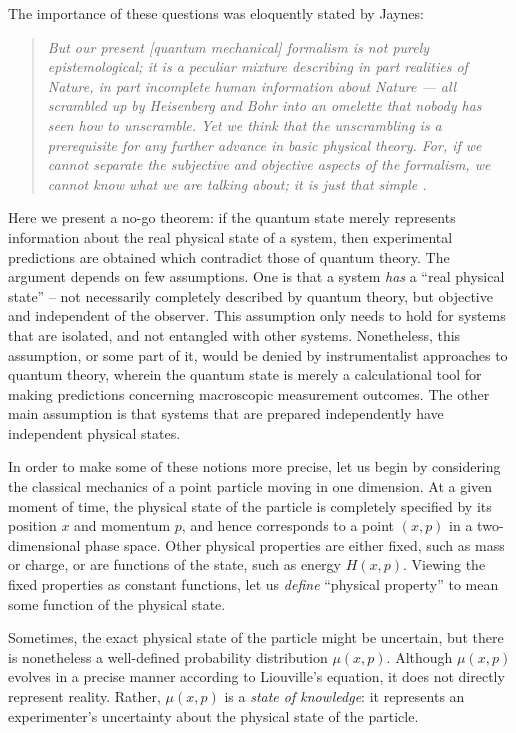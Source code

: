 \documentclass[amsmath,amssymb,superscriptaddress,pra,12pt]{revtex4-1}
\begin{document}
The importance of these questions was eloquently stated by Jaynes:
\begin{quotation}
\emph{But our present [quantum mechanical] formalism is not purely epistemological; it is a peculiar mixture describing in part realities of Nature, in part incomplete human information about Nature --- all scrambled up by Heisenberg and Bohr into an omelette that nobody has seen how to unscramble. Yet we think that the unscrambling is a prerequisite for any further advance in basic physical theory. For, if we cannot separate the subjective and objective aspects of the formalism, we cannot know what we are talking about; it is just that simple \cite{jaynesquote2}.}
\end{quotation}

Here we present a no-go theorem: if the quantum state merely represents information about the real physical state of a system, then experimental predictions are obtained which contradict those of quantum theory. The argument depends on few assumptions. One is that a system \emph{has} a ``real physical state'' -- not necessarily completely described by quantum theory, but objective and independent of the observer. This assumption only needs to hold for systems that are isolated, and not entangled with other systems. Nonetheless, this assumption, or some part of it, would be denied by instrumentalist approaches to quantum theory, wherein the quantum state is merely a calculational tool for making predictions concerning macroscopic measurement outcomes. The other main assumption is that systems that are prepared independently have independent physical states.

In order to make some of these notions more precise, let us begin by considering the classical mechanics of a point particle moving in one dimension. At a given moment of time, the physical state of the particle is completely specified by its position $x$ and momentum $p$, and hence corresponds to a point $(x,p)$ in a two-dimensional phase space. Other physical properties are either fixed, such as mass or charge, or are functions of the state, such as energy $H(x,p)$. Viewing the fixed properties as constant functions, let us \emph{define} ``physical property'' to mean some function of the physical state.

Sometimes, the exact physical state of the particle might be uncertain, but there is nonetheless a well-defined probability distribution $\mu(x,p)$. Although $\mu(x,p)$ evolves in a precise manner according to Liouville's equation, it does not directly represent reality. Rather, $\mu(x,p)$ is a \emph{state of knowledge}: it represents an experimenter's uncertainty about the physical state of the particle. 
\end{document}
